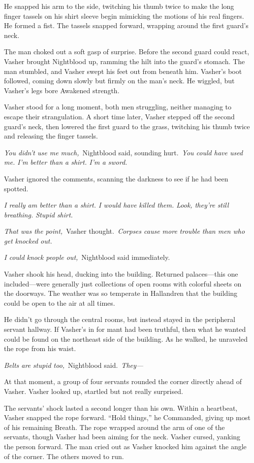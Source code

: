 He snapped his arm to the side, twitching his thumb twice to make the long finger tassels on his shirt sleeve begin mimicking the motions of his real fingers. He formed a fist. The tassels snapped forward, wrapping around the first guard’s neck.

The man choked out a soft gasp of surprise. Before the second guard could react, Vasher brought Nightblood up, ramming the hilt into the guard’s stomach. The man stumbled, and Vasher swept his feet out from beneath him. Vasher’s boot followed, coming down slowly but firmly on the man’s neck. He wiggled, but Vasher’s legs bore Awakened strength.

Vasher stood for a long moment, both men struggling, neither managing to escape their strangulation. A short time later, Vasher stepped off the second guard’s neck, then lowered the first guard to the grass, twitching his thumb twice and releasing the finger tassels.

\textit{You didn’t use me much,}~Nightblood said, sounding hurt.~\textit{You could have used me. I’m better than a shirt. I’m a sword.}

Vasher ignored the comments, scanning the darkness to see if he had been spotted.

\textit{I really am better than a shirt. I would have killed them. Look, they’re still breathing. Stupid shirt.}

\textit{That was the point,}~Vasher thought.~\textit{Corpses cause more trouble than men who get knocked out.}

\textit{I could knock people out,}~Nightblood said immediately.

Vasher shook his head, ducking into the building. Returned palaces—this one included—were generally just collections of open rooms with colorful sheets on the doorways. The weather was so temperate in Hallandren that the building could be open to the air at all times.

He didn’t go through the central rooms, but instead stayed in the peripheral servant hallway. If Vasher’s in for mant had been truthful, then what he wanted could be found on the northeast side of the building. As he walked, he unraveled the rope from his waist.

\textit{Belts are stupid too,}~Nightblood said.~\textit{They—}

At that moment, a group of four servants rounded the corner directly ahead of Vasher. Vasher looked up, startled but not really surprised.

The servants’ shock lasted a second longer than his own. Within a heartbeat, Vasher snapped the rope forward. “Hold things,” he Commanded, giving up most of his remaining Breath. The rope wrapped around the arm of one of the servants, though Vasher had been aiming for the neck. Vasher cursed, yanking the person forward. The man cried out as Vasher knocked him against the angle of the corner. The others moved to run.

